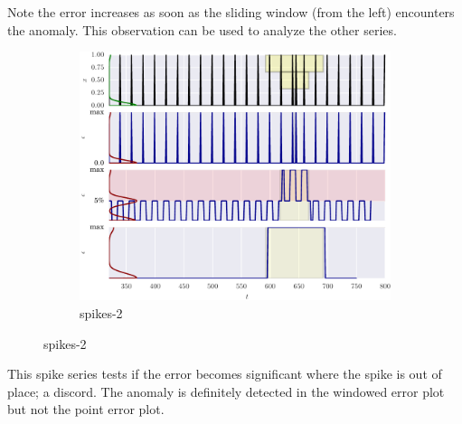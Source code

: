 Note the error increases as soon as the sliding window (from the left) encounters the anomaly.
%
This observation can be used to analyze the other series.



\begin{figure}[!hp]
    \ContinuedFloat 
    \begin{subfigure}[t]{\textwidth}
        \centering
        \includegraphics[]{figs/er_spikereg.pdf}
        \caption{spikes-2}
    \end{subfigure}%
\end{figure}

This spike series tests if the error becomes significant where the spike is out of place; a discord.
%
The anomaly is definitely detected in the windowed error plot but not the point error plot.




